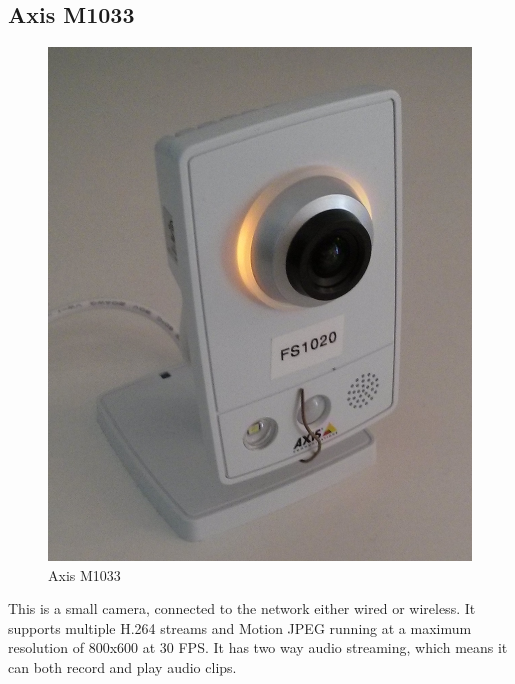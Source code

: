 \documentclass{LTHthesis}
\begin{document}
\subsection{Axis M1033}
\begin{figure}
    \centering
    \includegraphics[width=\textwidth]{m1033}
    \caption{Axis M1033}
    \label{fig:M1033}
\end{figure}
This is a small camera, connected to the network either wired or wireless. It supports multiple H.264 streams and Motion JPEG running at a maximum resolution of 800x600 at 30 FPS. It has two way audio streaming, which means it can both record and play audio clips.
\end{document}
